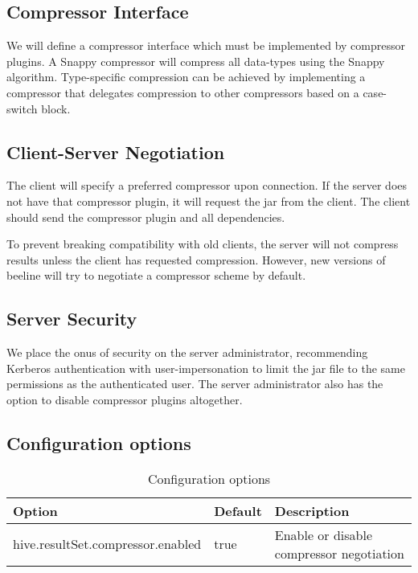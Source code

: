 \documentclass[11pt,a4paper]{article}
\begin{document}
	\subsection{Compressor Interface}
			We will define a compressor interface which must be implemented by compressor plugins.
			A Snappy compressor will compress all data-types using the Snappy algorithm.
			Type-specific compression can be achieved by implementing a compressor that delegates compression to other compressors based on a case-switch block.
		
		
	\subsection{Client-Server Negotiation}
		The client will specify a preferred compressor upon connection. 
		If the server does not have that compressor plugin, it will request the jar from the client. 
		The client should send the compressor plugin and all dependencies.
	
		To prevent breaking compatibility with old clients, the server will not compress results unless the client has requested compression.
		However, new versions of beeline will try to negotiate a compressor scheme by default.
		
		
	
	\subsection{Server Security}
		We place the onus of security on the server administrator, recommending Kerberos authentication with user-impersonation to limit the jar file to the same permissions as the authenticated user. 
		The server administrator also has the option to disable compressor plugins altogether.
		
		
	\subsection{Configuration options}
	\begin{table}[H]
		\begin{tabular}{| l | l | p{4cm} |} \hline
			\textbf{Option} & \textbf{Default} & \textbf{Description} \\ \hline
			hive.resultSet.compressor.enabled & true & Enable or disable compressor negotiation \\ \hline
		\end{tabular}
		\caption{Configuration options}
	\end{table}
\end{document}
